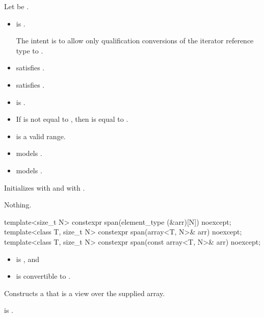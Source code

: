 \begin{itemdescr}
\pnum
\constraints
Let  be .
\begin{itemize}
\item
{} is .
\begin{note}
The intent is to allow only qualification conversions
of the iterator reference type to .
\end{note}
\item {} satisfies .
\item {} satisfies .
\item {} is .
\end{itemize}

\pnum
\expects
\begin{itemize}
\item
If  is not equal to ,
then  is equal to .
\item {} is a valid range.
\item {} models .
\item {} models .
\end{itemize}

\pnum
\effects
Initializes  with  and
 with .

\pnum
\throws
Nothing.
\end{itemdescr}

%
\begin{itemdecl}
template<size_t N> constexpr span(element_type (&arr)[N]) noexcept;
template<class T, size_t N> constexpr span(array<T, N>& arr) noexcept;
template<class T, size_t N> constexpr span(const array<T, N>& arr) noexcept;
\end{itemdecl}

\begin{itemdescr}
\pnum
\constraints
\begin{itemize}
\item {} is , and
\item {} is convertible to .
\end{itemize}

\pnum
\effects
Constructs a  that is a view over the supplied array.

\pnum
\ensures
{} is .
\end{itemdescr}

